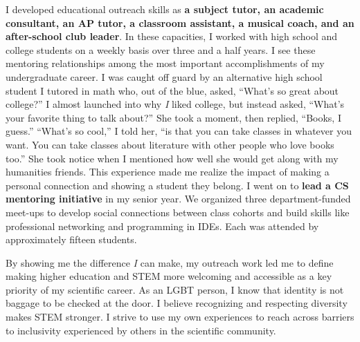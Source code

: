 \noindent
\underline{}
I developed educational outreach skills as \textbf{a subject tutor, an academic consultant, an AP tutor, a classroom assistant, a musical coach, and an after-school club leader}.
In these capacities, I worked with high school and college students on a weekly basis over three and a half years.
I see these mentoring relationships among the most important accomplishments of my undergraduate career.
I was caught off guard by an alternative high school student I tutored in math who, out of the blue, asked, ``What's so great about college?''
I almost launched into why \textit{I} liked college, but instead asked, ``What's your favorite thing to talk about?''
She took a moment, then replied, ``Books, I guess.''
``What's so cool,'' I told her, ``is that you can take classes in whatever you want.
You can take classes about literature with other people who love books too.''
She took notice when I mentioned how well she would get along with my humanities friends.
This experience made me realize the impact of making a personal connection and showing a student they belong.
I went on to \textbf{lead a CS mentoring initiative} in my senior year.
We organized three department-funded meet-ups to develop social connections between class cohorts and build skills like professional networking and programming in IDEs.
Each was attended by approximately fifteen students.

By showing me the difference \textit{I} can make, my outreach work
led me to define making higher education and STEM more welcoming and accessible as a key priority of my scientific career.
As an LGBT person, I know that identity is not baggage to be checked at the door.
I believe recognizing and respecting diversity makes STEM stronger.
I strive to use my own experiences to reach across barriers to inclusivity experienced by others in the scientific community.
